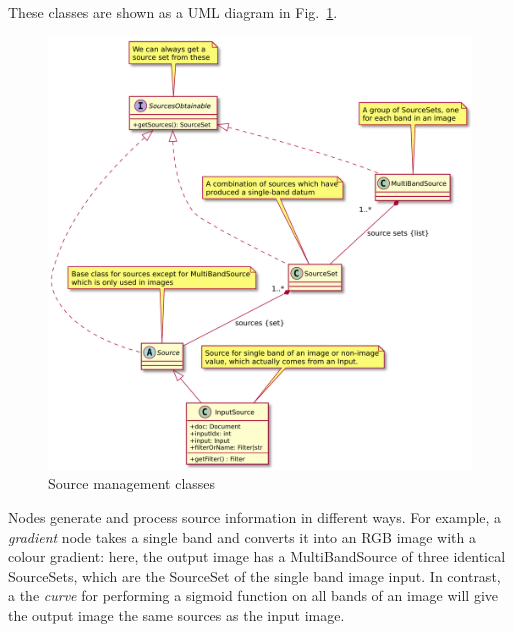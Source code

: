 These classes are shown as a UML diagram in Fig.~\ref{source.pdf}.
\clearpage
\begin{figure}[ht]
\center
\includegraphics[width=5in]{source.pdf}
\caption{Source management classes}
\label{source.pdf}
\end{figure}

Nodes generate and process source information in different ways. For example, a
\emph{gradient} node takes a single band and converts it into an RGB image
with a colour gradient: here, the output image has a MultiBandSource of three
identical SourceSets, which are the SourceSet of the single band image input.
In contrast, a the \emph{curve} for performing a
sigmoid function on all bands of an image will give the output image the
same sources as the input image.


